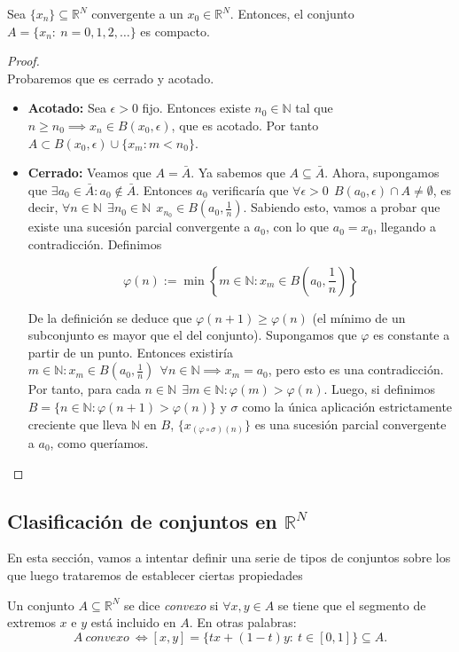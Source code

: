 \begin{nprop}
Sea $\{x_n\} \subseteq \mathbb{R}^N$ convergente a un $x_0 \in \mathbb{R}^N$. Entonces, el conjunto \hfill \\$A = \{x_n:\ n=0,1,2,\dots \}$ es compacto.
\end{nprop}

\begin{proof}\hfill\\
  Probaremos que es cerrado y acotado.

  \begin{itemize}
  \item \textbf{Acotado:} Sea $\epsilon>0$ fijo. Entonces existe $n_0 \in \mathbb{N}$ tal que $n \ge n_0 \implies x_n \in B(x_0, \epsilon)$, que es acotado.
    Por tanto $A \subset B(x_0, \epsilon) \cup \{ x_m : m < n_0 \}$.

  \item \textbf{Cerrado:} Veamos que $A = \bar{A}$. Ya sabemos que $A \subseteq \bar{A}$. Ahora, supongamos que $\exists a_0 \in \bar{A} : a_0 \notin \bar{A}$.
    Entonces $a_0$ verificaría que $\forall \epsilon > 0 \ \ B(a_0, \epsilon) \cap A \ne \emptyset$, es decir, $\forall n \in \mathbb{N} \ \ \exists n_0\in \mathbb{N} \ \ x_{n_0} \in B\left(a_0, \frac{1}{n}\right)$.
    Sabiendo esto, vamos a probar que existe una sucesión parcial convergente a $a_0$, con lo que $a_0 = x_0$, llegando a contradicción. Definimos

    \[
       \varphi(n) := \min \left\{ m\in \mathbb{N} : x_m \in B\left(a_0, \frac{1}{n}\right) \right\}
       \]

       De la definición se deduce que $\varphi(n+1) \ge \varphi(n)$ (el mínimo de un subconjunto es mayor que el del conjunto). Supongamos que $\varphi$ es constante a partir de un punto.
       Entonces existiría $m \in \mathbb{N} : x_m \in B(a_0, \frac{1}{n}) \ \ \forall n\in \mathbb{N} \implies x_m = a_0$, pero esto es una contradicción. Por tanto, para cada $n \in \mathbb{N} \ \ \exists m \in \mathbb{N} : \varphi(m) > \varphi(n)$. Luego, si definimos $B = \{ n \in \mathbb{N} : \varphi(n+1) > \varphi(n) \}$ y $\sigma$ como la única aplicación estrictamente creciente que lleva $\mathbb{N}$ en $B$, $\{x_{(\varphi \circ \sigma)(n)}\}$ es una sucesión parcial convergente a $a_0$, como queríamos.
  \end{itemize}
\end{proof}



\subsection{Clasificación de conjuntos en $\mathbb{R}^N$}
En esta sección, vamos a intentar definir una serie de tipos de conjuntos sobre los que luego trataremos de establecer ciertas propiedades
\begin{ndef}
Un conjunto $A\subseteq \mathbb{R}^N$ se dice \textit{convexo} si $\forall x,y \in A$ se tiene que el segmento de extremos $x$ e $y$ está incluido en $A$. En otras palabras: $$A\ convexo\ \iff [x,y] = \{tx + (1-t)y: \ t\in [0,1]\} \subseteq A.$$
\end{ndef}




